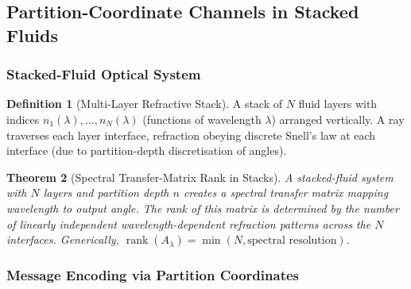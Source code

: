 \documentclass[11pt,twocolumn,a4paper]{article}
\newtheorem{theorem}{Theorem}[section]
\theoremstyle{definition}
\newtheorem{definition}[theorem]{Definition}
\DeclareMathOperator{\rank}{rank}
\begin{document}
\subsection{Partition-Coordinate Channels in Stacked Fluids}

\subsubsection{Stacked-Fluid Optical System}

\begin{definition}[Multi-Layer Refractive Stack]
A stack of $N$ fluid layers with indices $n_1(\lambda), \ldots, n_N(\lambda)$ (functions of wavelength $\lambda$) arranged vertically. A ray traverses each layer interface, refraction obeying discrete Snell's law at each interface (due to partition-depth discretisation of angles).
\end{definition}

\begin{theorem}[Spectral Transfer-Matrix Rank in Stacks]
\label{thm:stack-rank}
A stacked-fluid system with $N$ layers and partition depth $n$ creates a spectral transfer matrix mapping wavelength to output angle. The rank of this matrix is determined by the number of linearly independent wavelength-dependent refraction patterns across the $N$ interfaces. Generically, $\rank(A_\lambda) = \min(N, \text{spectral resolution})$.
\end{theorem}

\subsubsection{Message Encoding via Partition Coordinates}
\end{document}
